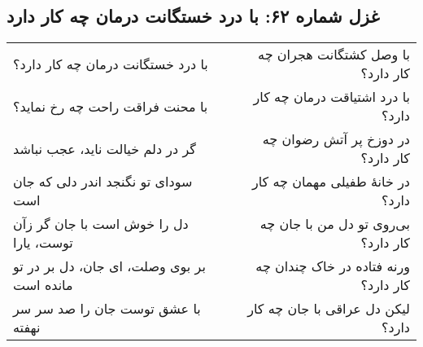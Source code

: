 \begin{center}
\section*{غزل شماره ۶۲: با درد خستگانت درمان چه کار دارد}
\label{sec:062}
\begin{longtable}{l p{0.5cm} r}
با درد خستگانت درمان چه کار دارد؟
&&
با وصل کشتگانت هجران چه کار دارد؟
\\
با محنت فراقت راحت چه رخ نماید؟
&&
با درد اشتیاقت درمان چه کار دارد؟
\\
گر در دلم خیالت ناید، عجب نباشد
&&
در دوزخ پر آتش رضوان چه کار دارد؟
\\
سودای تو نگنجد اندر دلی که جان است
&&
در خانهٔ طفیلی مهمان چه کار دارد؟
\\
دل را خوش است با جان گر زآن توست، یارا
&&
بی‌روی تو دل من با جان چه کار دارد؟
\\
بر بوی وصلت، ای جان، دل بر در تو مانده است
&&
ورنه فتاده در خاک چندان چه کار دارد؟
\\
با عشق توست جان را صد سر سر نهفته
&&
لیکن دل عراقی با جان چه کار دارد؟
\\
\end{longtable}
\end{center}

